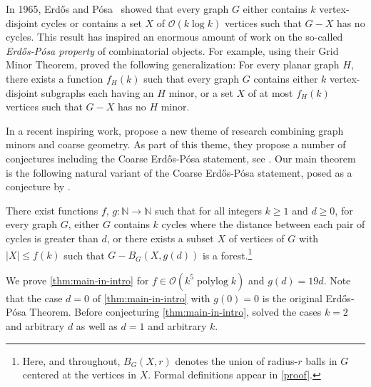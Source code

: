 \documentclass{patmorin}
\DeclareMathOperator{\polylog}{polylog}
\newcommand{\Oh}{\mathcal{O}}
\begin{document}
In 1965, Erdős and Pósa~\cite{EP1965} showed that every graph $G$ 
either contains $k$ vertex-disjoint cycles 
or contains a set $X$ of $\Oh(k\log k)$ vertices such that $G-X$ has no cycles. 
This result has inspired an enormous amount of work on the so-called \emph{Erdős-Pósa property} of combinatorial objects. 
For example, using their Grid Minor Theorem, \citet{RS1986} proved the following generalization: For every planar graph $H$, there exists a function $f_H(k)$ such that every graph $G$ contains either $k$ vertex-disjoint subgraphs each having an $H$ minor, or a set $X$ of at most $f_H(k)$ vertices such that $G-X$ has no $H$ minor. 

In a recent inspiring work, \citet{GP23} propose a new theme of research combining graph minors and coarse geometry. 
As part of this theme, they propose a number of conjectures including the Coarse Erdős-Pósa statement, see \cite[Conjecture 9.7]{GP23}. Our main theorem is the following natural variant of the Coarse Erdős-Pósa statement, posed as a conjecture by \citet{ahn.gollin:coarse}.
\begin{thm}\label{thm:main-in-intro}
  There exist functions $f,\, g:\mathbb{N}\to\mathbb{N}$ such that for all integers $k\ge 1$ and $d\ge 0$, for every graph $G$,  either $G$ contains $k$ cycles where the distance between each pair of cycles is greater than $d$, or  there exists a subset $X$ of vertices of $G$ with $|X|\leq f(k)$ such that  $G-B_G(X,g(d))$ is a forest.\footnote{Here, and throughout, $B_G(X,r)$ denotes the union of radius-$r$ balls in $G$ centered at the vertices in $X$.  Formal definitions appear in \cref{proof}.}
\end{thm}
We prove \cref{thm:main-in-intro} for $f\in\Oh(k^5\polylog k)$ and $g(d)=19d$. 
Note that the case $d=0$ of \cref{thm:main-in-intro} with $g(0)=0$ is the original Erd\H{o}s-Pósa Theorem. 
Before conjecturing \cref{thm:main-in-intro}, \citet{ahn.gollin:coarse} solved the cases $k=2$ and arbitrary $d$ as well as $d=1$ and arbitrary $k$.  



\end{document}

